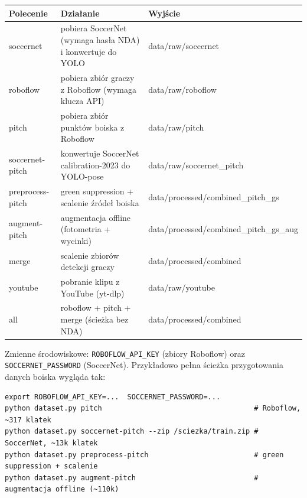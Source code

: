 \documentclass[11pt,a4paper]{article}
\begin{document}
\begin{center}
\small
\begin{tabular}{>{\ttfamily}l p{6.3cm} >{\ttfamily\footnotesize}l}
\toprule
\normalfont Polecenie & Działanie & \normalfont Wyjście \\
\midrule
soccernet         & pobiera SoccerNet (wymaga hasła NDA) i konwertuje do YOLO & data/raw/soccernet \\
roboflow          & pobiera zbiór graczy z Roboflow (wymaga klucza API)       & data/raw/roboflow \\
pitch             & pobiera zbiór punktów boiska z Roboflow                   & data/raw/pitch \\
soccernet-pitch   & konwertuje SoccerNet calibration-2023 do YOLO-pose        & data/raw/soccernet\_pitch \\
preprocess-pitch  & green suppression + scalenie źródeł boiska                & data/processed/combined\_pitch\_gs \\
augment-pitch     & augmentacja offline (fotometria + wycinki)                & data/processed/combined\_pitch\_gs\_aug \\
merge             & scalenie zbiorów detekcji graczy                          & data/processed/combined \\
youtube           & pobranie klipu z YouTube (yt-dlp)                         & data/raw/youtube \\
all               & roboflow + pitch + merge (ścieżka bez NDA)                & data/processed/combined \\
\bottomrule
\end{tabular}
\end{center}

Zmienne środowiskowe: \texttt{ROBOFLOW\_API\_KEY} (zbiory Roboflow) oraz
\texttt{SOCCERNET\_PASSWORD} (SoccerNet). Przykładowo pełna ścieżka przygotowania
danych boiska wygląda tak:

\begin{lstlisting}[style=sh]
export ROBOFLOW_API_KEY=...  SOCCERNET_PASSWORD=...
python dataset.py pitch                                    # Roboflow, ~317 klatek
python dataset.py soccernet-pitch --zip /sciezka/train.zip # SoccerNet, ~13k klatek
python dataset.py preprocess-pitch                         # green suppression + scalenie
python dataset.py augment-pitch                            # augmentacja offline (~110k)
\end{lstlisting}

\end{document}
